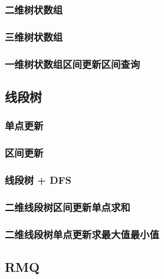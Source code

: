 \documentclass[a4paper, 12pt]{article}
\begin{document}
\subsubsection{二维树状数组}

\subsubsection{三维树状数组}

\subsubsection{一维树状数组区间更新区间查询}


\subsection{线段树}
\subsubsection{单点更新}

\subsubsection{区间更新}

\subsubsection{线段树 + DFS}

\subsubsection{二维线段树区间更新单点求和}

\subsubsection{二维线段树单点更新求最大值最小值}


\subsection{RMQ}
\end{document}
